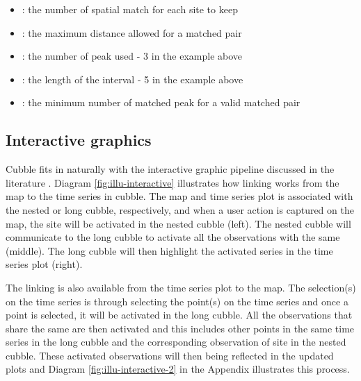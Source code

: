 \documentclass[
]{jss}
\providecommand{\tightlist}{%
  \setlength{\itemsep}{0pt}\setlength{\parskip}{0pt}}
\begin{document}
\begin{itemize}
\tightlist
\item
  : the number of spatial match for each site to
  keep
\item
  : the maximum distance allowed for a matched
  pair
\item
  : the number of peak used - 3 in the example
  above
\item
  : the length of the interval - 5 in the example
  above
\item
  : the minimum number of matched peak for a
  valid matched pair
\end{itemize}

\hypertarget{interactive-graphics}{%
\subsection{Interactive graphics}\label{interactive-graphics}}

Cubble fits in naturally with the interactive graphic pipeline discussed
in the literature
\citep{buja1988elements, buja1996interactive, sutherland2000orca, xie2014reactive, cheng2016enabling}.
Diagram \ref{fig:illu-interactive} illustrates how linking works from
the map to the time series in cubble. The map and time series plot is
associated with the nested or long cubble, respectively, and when a user
action is captured on the map, the site will be activated in the nested
cubble (left). The nested cubble will communicate to the long cubble to
activate all the observations with the same  (middle). The long
cubble will then highlight the activated series in the time series plot
(right).

The linking is also available from the time series plot to the map. The
selection(s) on the time series is through selecting the point(s) on the
time series and once a point is selected, it will be activated in the
long cubble. All the observations that share the same  are then
activated and this includes other points in the same time series in the
long cubble and the corresponding observation of site in the nested
cubble. These activated observations will then being reflected in the
updated plots and Diagram \ref{fig:illu-interactive-2} in the Appendix
illustrates this process.
\end{document}

